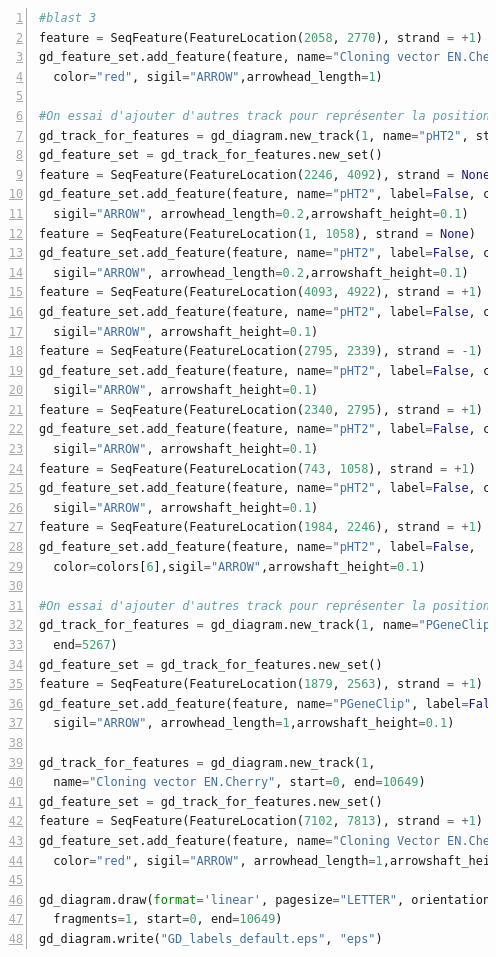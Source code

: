 \documentclass[10.9pt]{article} %
\begin{document}
\begin{lstlisting}[frame=single,numbers=left,language=Python]
#blast 3
feature = SeqFeature(FeatureLocation(2058, 2770), strand = +1)
gd_feature_set.add_feature(feature, name="Cloning vector EN.Cherry", label=True,
  color="red", sigil="ARROW",arrowhead_length=1)

#On essai d'ajouter d'autres track pour représenter la position des blasts
gd_track_for_features = gd_diagram.new_track(1, name="pHT2", start=0, end=4924)
gd_feature_set = gd_track_for_features.new_set()
feature = SeqFeature(FeatureLocation(2246, 4092), strand = None)
gd_feature_set.add_feature(feature, name="pHT2", label=False, color=colors[2], 
  sigil="ARROW", arrowhead_length=0.2,arrowshaft_height=0.1)
feature = SeqFeature(FeatureLocation(1, 1058), strand = None)
gd_feature_set.add_feature(feature, name="pHT2", label=False, color=colors[0],
  sigil="ARROW", arrowhead_length=0.2,arrowshaft_height=0.1)
feature = SeqFeature(FeatureLocation(4093, 4922), strand = +1)
gd_feature_set.add_feature(feature, name="pHT2", label=False, color=colors[3], 
  sigil="ARROW", arrowshaft_height=0.1)
feature = SeqFeature(FeatureLocation(2795, 2339), strand = -1)
gd_feature_set.add_feature(feature, name="pHT2", label=False, color=colors[1], 
  sigil="ARROW", arrowshaft_height=0.1)
feature = SeqFeature(FeatureLocation(2340, 2795), strand = +1)
gd_feature_set.add_feature(feature, name="pHT2", label=False, color=colors[4], 
  sigil="ARROW", arrowshaft_height=0.1)
feature = SeqFeature(FeatureLocation(743, 1058), strand = +1)
gd_feature_set.add_feature(feature, name="pHT2", label=False, color=colors[5], 
  sigil="ARROW", arrowshaft_height=0.1)
feature = SeqFeature(FeatureLocation(1984, 2246), strand = +1)
gd_feature_set.add_feature(feature, name="pHT2", label=False,
  color=colors[6],sigil="ARROW",arrowshaft_height=0.1)

#On essai d'ajouter d'autres track pour représenter la position des blasts
gd_track_for_features = gd_diagram.new_track(1, name="PGeneClip", start=0, 
  end=5267)
gd_feature_set = gd_track_for_features.new_set()
feature = SeqFeature(FeatureLocation(1879, 2563), strand = +1)
gd_feature_set.add_feature(feature, name="PGeneClip", label=False, color="blue", 
  sigil="ARROW", arrowhead_length=1,arrowshaft_height=0.1)

gd_track_for_features = gd_diagram.new_track(1, 
  name="Cloning vector EN.Cherry", start=0, end=10649)
gd_feature_set = gd_track_for_features.new_set()
feature = SeqFeature(FeatureLocation(7102, 7813), strand = +1)
gd_feature_set.add_feature(feature, name="Cloning Vector EN.Cherry", label=False, 
  color="red", sigil="ARROW", arrowhead_length=1,arrowshaft_height=0.1)

gd_diagram.draw(format='linear', pagesize="LETTER", orientation="portrait",
  fragments=1, start=0, end=10649)
gd_diagram.write("GD_labels_default.eps", "eps")
\end{lstlisting}
\end{document}
